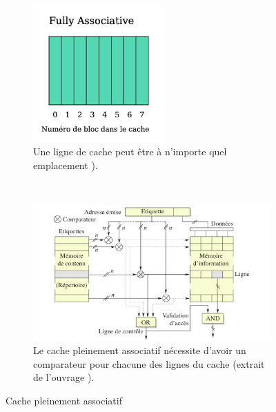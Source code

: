 \begin{figure}
                \centering
                \begin{subfigure}[b]{0.35\linewidth}
                    \includegraphics[width=5cm]{images/cache_asso.png}
                    \caption{Une ligne de cache peut être à n'importe quel emplacement \cite{Meunier2017}).}
                    \label{pic:cache_asso}
                \end{subfigure}
                ~ %
                \begin{subfigure}[b]{0.60\linewidth}
                    \includegraphics[width=\linewidth]{images/cache_circuit-fully-associative.png}
                    \caption{Le cache pleinement associatif nécessite d'avoir un comparateur pour chacune des lignes du cache (extrait de l'ouvrage \cite{Blanchet2013}).}
                    \label{pic:cache_circuit-fully-associative}
                \end{subfigure}
                \caption{Cache pleinement associatif}\label{pic:cachemappage_fully}
            

\end{figure}
